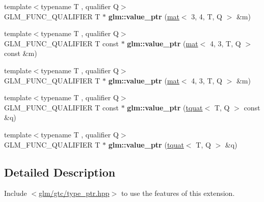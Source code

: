 \begin{DoxyCompactItemize}
\item 
\mbox{\label{group__gtc__type__ptr_ga9b9841a59cedf4f06882863900c36787}} 
{\footnotesize template$<$typename T , qualifier Q$>$ }\\G\+L\+M\+\_\+\+F\+U\+N\+C\+\_\+\+Q\+U\+A\+L\+I\+F\+I\+ER T $\ast$ {\bfseries glm\+::value\+\_\+ptr} (\hyperlink{structglm_1_1mat}{mat}$<$ 3, 4, T, Q $>$ \&m)
\item 
\mbox{\label{group__gtc__type__ptr_ga50654758b47589e7dea0aa0bcb50adfb}} 
{\footnotesize template$<$typename T , qualifier Q$>$ }\\G\+L\+M\+\_\+\+F\+U\+N\+C\+\_\+\+Q\+U\+A\+L\+I\+F\+I\+ER T const  $\ast$ {\bfseries glm\+::value\+\_\+ptr} (\hyperlink{structglm_1_1mat}{mat}$<$ 4, 3, T, Q $>$ const \&m)
\item 
\mbox{\label{group__gtc__type__ptr_gad33202dd8b191c31df6ed81b63bc2e52}} 
{\footnotesize template$<$typename T , qualifier Q$>$ }\\G\+L\+M\+\_\+\+F\+U\+N\+C\+\_\+\+Q\+U\+A\+L\+I\+F\+I\+ER T $\ast$ {\bfseries glm\+::value\+\_\+ptr} (\hyperlink{structglm_1_1mat}{mat}$<$ 4, 3, T, Q $>$ \&m)
\item 
\mbox{\label{group__gtc__type__ptr_ga8d5728b67f88d8fcce096db3885d74f0}} 
{\footnotesize template$<$typename T , qualifier Q$>$ }\\G\+L\+M\+\_\+\+F\+U\+N\+C\+\_\+\+Q\+U\+A\+L\+I\+F\+I\+ER T const  $\ast$ {\bfseries glm\+::value\+\_\+ptr} (\hyperlink{structglm_1_1tquat}{tquat}$<$ T, Q $>$ const \&q)
\item 
\mbox{\label{group__gtc__type__ptr_ga38e914875e288a10c99139869be4426a}} 
{\footnotesize template$<$typename T , qualifier Q$>$ }\\G\+L\+M\+\_\+\+F\+U\+N\+C\+\_\+\+Q\+U\+A\+L\+I\+F\+I\+ER T $\ast$ {\bfseries glm\+::value\+\_\+ptr} (\hyperlink{structglm_1_1tquat}{tquat}$<$ T, Q $>$ \&q)
\end{DoxyCompactItemize}


\subsection{Detailed Description}
Include $<$\hyperlink{type__ptr_8hpp}{glm/gtc/type\+\_\+ptr.\+hpp}$>$ to use the features of this extension.

